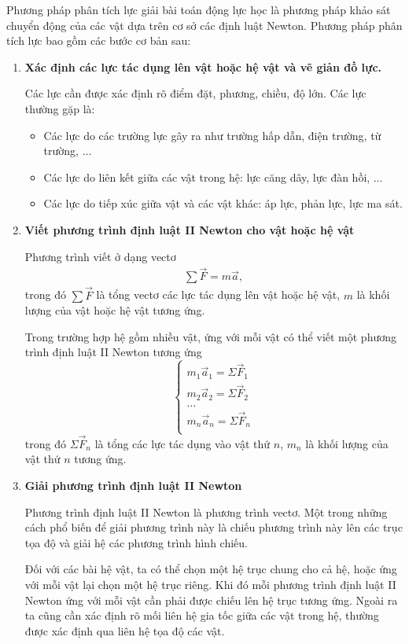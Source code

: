 Phương pháp phân tích lực giải bài toán động lực học là phương pháp khảo sát chuyển động của các vật dựa trên cơ sở các định luật Newton. Phương pháp phân tích lực bao gồm các bước cơ bản sau:
	 \begin{enumerate}[label=\textbf{\arabic*}.]
	 	\item \textbf{Xác định các lực tác dụng lên vật hoặc hệ vật và vẽ giản đồ lực.}
	 		
	 		Các lực cần được xác định rõ điểm đặt, phương, chiều, độ lớn. Các lực thường gặp là: 
	 			\begin{itemize}
	 				\item Các lực do các trường lực gây ra như trường hấp dẫn, điện trường, từ trường, $\ldots$
	 				\item Các lực do liên kết giữa các vật trong hệ: lực căng dây, lực đàn hồi, $\ldots$
	 				\item Các lực do tiếp xúc giữa vật và các vật khác: áp lực, phản lực, lực ma sát.
	 			\end{itemize}
	 	\item \textbf{Viết phương trình định luật II Newton cho vật hoặc hệ vật }
	 	
	 		Phương trình viết ở dạng vectơ 
	 			\begin{align}
	 				\sum\vec{F}=m\vec{a},
	 			\end{align}
 			trong đó $\sum\vec{F}$ là tổng vectơ các lực tác dụng lên vật hoặc hệ vật, $m$ là khối lượng của vật hoặc hệ vật tương ứng. 
 			
 			Trong trường hợp hệ gồm nhiều vật, ứng với mỗi vật có thể viết một phương trình định luật II Newton tương ứng
 				$$\begin{cases}
 					m_1 \vec{a}_1 = \Sigma \vec{F}_1\\
 					m_2 \vec{a}_2 = \Sigma \vec{F}_2\\
 					\ldots\\
 					m_n \vec{a}_n = \Sigma \vec{F}_n\\
 				\end{cases}$$
 			trong đó  $\Sigma \vec{F}_n$ là tổng các lực tác dụng vào vật thứ $n$, $m_n$ là khối lượng của vật thứ $n$ tương ứng. 
 			 
	 	\item \textbf{Giải phương trình định luật II Newton }
	 		
	 		Phương trình định luật II Newton là phương trình vectơ. Một trong những cách phổ biến để giải phương trình này là chiếu phương trình này lên các trục tọa độ và giải hệ các phương trình hình chiếu. 
	 		
	 		Đối với các bài hệ vật, ta có thể chọn một hệ trục chung cho cả hệ, hoặc ứng với mỗi vật lại chọn một hệ trục riêng. Khi đó mỗi phương trình định luật II Newton ứng với mỗi vật cần phải được chiếu lên hệ trục tương ứng. Ngoài ra ta cũng cần xác định rõ mối liên hệ gia tốc giữa các vật trong hệ, thường được xác định qua liên hệ tọa độ các vật. 
	\end{enumerate}

